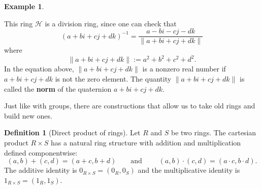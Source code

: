 \documentclass[12pt]{report}
\numberwithin{equation}{section}
\numberwithin{theorem}{chapter}
\theoremstyle{definition}
\newtheorem{definition}[theorem]{Definition}
\newtheorem{example}[theorem]{Example}
\newtheorem*{basic properties}{Basic Properties}
\newtheorem*{Important Remark}{Important Remark}
\newcommand{\df}[1]{{\bf #1}\index{#1}}
\DeclareMathOperator{\Fun}{Fun}
\newcommand{\C}{\mathbb{C}}
\DeclareMathOperator{\Mat}{Mat}
\begin{document}
\begin{example}
\begin{enumerate}[itemsep=0.2em,leftmargin=20pt]
This ring $\mathcal{H}$ is a division ring, since one can check that
$$(a + bi + cj + dk)^{-1} = \frac{a -  bi -  cj - dk}{\|a + bi + cj + dk\|}$$
where
$$\|a + bi + cj + dk \| := a^2 + b^2 + c^2 + d^2.$$
In the equation above, $\|a + bi + cj + dk \|$ is a nonzero real number if $a + bi + cj + dk$ is not the zero element. The quantity $\|a + bi + cj + dk \|$ is called the \df{norm} of the quaternion $a + bi + cj + dk$.




\end{enumerate}
\end{example}


Just like with groups, there are constructions that allow us to take old rings and build new ones.


\begin{definition}[Direct product of rings]
Let $R$ and $S$ be two rings.
The cartesian product $R\times S$ has a natural ring structure with addition and multiplication defined componentwise:
$$(a,b)+(c,d)=(a+c,b+d) \qquad \text{and } \qquad (a,b)\cdot(c,d)=(a\cdot c,b\cdot d).$$
The additive identity is $0_{R \times S} = (0_R, 0_{S})$ and the multiplicative identity is $1_{R \times S} = (1_R, 1_{S})$.
\end{definition}
\end{document}
